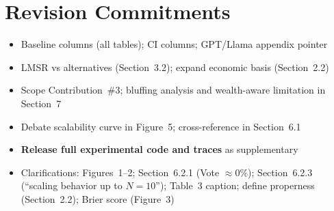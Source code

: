 \documentclass[10pt]{article}
\begin{document}
\section*{Revision Commitments}

\begin{itemize}[noitemsep,topsep=2pt,leftmargin=*]
  \item Baseline columns (all tables); CI columns; GPT/Llama appendix pointer
  \item LMSR vs alternatives (Section~3.2); expand economic basis (Section~2.2)
  \item Scope Contribution~\#3; bluffing analysis and wealth-aware limitation
        in Section~7
  \item Debate scalability curve in Figure~5; cross-reference
        \citet{amayuelas2024multiagent} in Section~6.1
  \item \textbf{Release full experimental code and traces} as supplementary
  \item Clarifications: Figures~1--2; Section~6.2.1 (Vote $\approx 0\%$);
        Section~6.2.3 (``scaling behavior up to $N{=}10$''); Table~3 caption;
        define properness (Section~2.2); Brier score (Figure~3)
\end{itemize}
\end{document}
